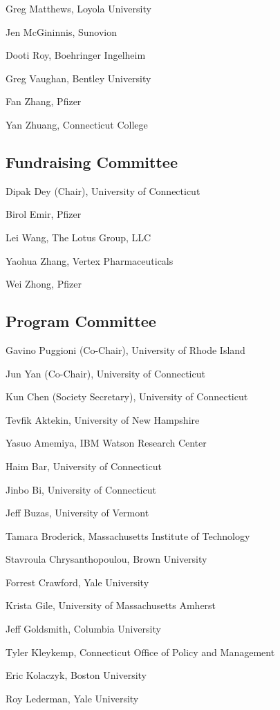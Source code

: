 \documentclass[10pt]{article}
\begin{document}
{Greg Matthews, Loyola University

Jen McGininnis, Sunovion

Dooti Roy, Boehringer Ingelheim

Greg Vaughan, Bentley University

Fan Zhang, Pfizer

Yan Zhuang, Connecticut College

\subsection*{Fundraising Committee}

Dipak Dey (Chair), University of Connecticut

Birol Emir, Pfizer

Lei Wang, The Lotus Group, LLC

Yaohua Zhang, Vertex Pharmaceuticals

Wei Zhong, Pfizer

\subsection*{Program Committee}

Gavino Puggioni (Co-Chair), University of Rhode Island

Jun Yan (Co-Chair), University of Connecticut

Kun Chen (Society Secretary), University of Connecticut

\bigskip

Tevfik Aktekin, University of New Hampshire

Yasuo Amemiya, IBM Watson Research Center

Haim Bar, University of Connecticut

Jinbo Bi, University of Connecticut

Jeff Buzas, University of Vermont

Tamara Broderick, Massachusetts Institute of Technology

Stavroula Chrysanthopoulou, Brown University

Forrest Crawford, Yale University

Krista Gile, University of Massachusetts Amherst

Jeff Goldsmith, Columbia University

Tyler Kleykemp, Connecticut Office of Policy and Management

Eric Kolaczyk, Boston University

Roy Lederman, Yale University

}
\end{document}
